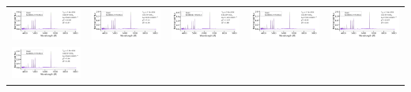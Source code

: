 \begin{center}
\begin{longtable}{l l l l l }
    \includegraphics[width=0.19\linewidth, clip]{model_140000_37.27_3.78.pdf} & \includegraphics[width=0.19\linewidth, clip]{model_130000_37.15_3.65.pdf} & \includegraphics[width=0.19\linewidth, clip]{model_200000_36.19_3.00.pdf} & \includegraphics[width=0.19\linewidth, clip]{model_130000_37.03_3.54.pdf} & \includegraphics[width=0.19\linewidth, clip]{model_140000_36.98_3.54.pdf} \\
    \includegraphics[width=0.19\linewidth, clip]{model_150000_37.22_3.78.pdf} \\
  \end{longtable}
\end{center}
